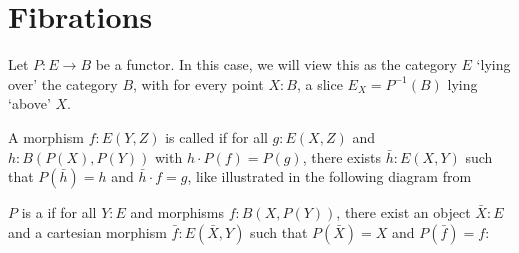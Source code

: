 \section{Fibrations}
Let $ P : E \to B $ be a functor. In this case, we will view this as the category $ E $ `lying over' the category $ B $, with for every point $ X: B $, a slice $ E_X = P^{-1}(B) $ lying `above' $ X $.

\begin{definition}
  A morphism $ f: E(Y, Z) $ is called  if for all $ g: E(X, Z) $ and $ h: B(P(X), P(Y)) $ with $ h \cdot P(f) = P(g) $, there exists $ \bar h: E(X, Y) $ such that $ P(\bar h) = h $ and $ \bar h \cdot f = g $, like illustrated in the following diagram from \autocite{nlab:grothendieck_fibration}
  \begin{center}
  \end{center}
\end{definition}

\begin{definition}
  $ P $ is a  if for all $ Y: E $ and morphisms $ f: B(X, P(Y)) $, there exist an object $ \bar X: E $ and a cartesian morphism $ \bar f: E(\bar X, Y) $ such that $ P(\bar X) = X $ and $ P(\bar f) = f $:
  \begin{center}
  \end{center}
\end{definition}

